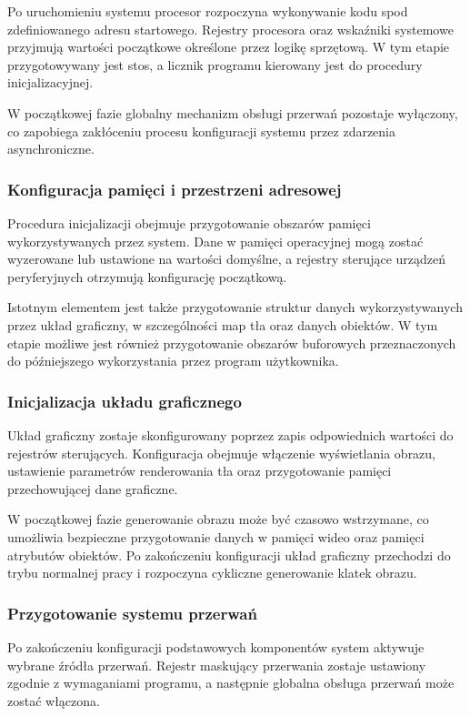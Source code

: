 \documentclass{article}
\begin{document}
Po uruchomieniu systemu procesor rozpoczyna wykonywanie kodu spod zdefiniowanego adresu startowego. Rejestry procesora oraz wskaźniki systemowe przyjmują wartości początkowe określone przez logikę sprzętową. W tym etapie przygotowywany jest stos, a licznik programu kierowany jest do procedury inicjalizacyjnej.

W początkowej fazie globalny mechanizm obsługi przerwań pozostaje wyłączony, co zapobiega zakłóceniu procesu konfiguracji systemu przez zdarzenia asynchroniczne.

\subsubsection{Konfiguracja pamięci i przestrzeni adresowej}

Procedura inicjalizacji obejmuje przygotowanie obszarów pamięci wykorzystywanych przez system. Dane w pamięci operacyjnej mogą zostać wyzerowane lub ustawione na wartości domyślne, a rejestry sterujące urządzeń peryferyjnych otrzymują konfigurację początkową.

Istotnym elementem jest także przygotowanie struktur danych wykorzystywanych przez układ graficzny, w szczególności map tła oraz danych obiektów. W tym etapie możliwe jest również przygotowanie obszarów buforowych przeznaczonych do późniejszego wykorzystania przez program użytkownika.

\subsubsection{Inicjalizacja układu graficznego}

Układ graficzny zostaje skonfigurowany poprzez zapis odpowiednich wartości do rejestrów sterujących. Konfiguracja obejmuje włączenie wyświetlania obrazu, ustawienie parametrów renderowania tła oraz przygotowanie pamięci przechowującej dane graficzne.

W początkowej fazie generowanie obrazu może być czasowo wstrzymane, co umożliwia bezpieczne przygotowanie danych w pamięci wideo oraz pamięci atrybutów obiektów. Po zakończeniu konfiguracji układ graficzny przechodzi do trybu normalnej pracy i rozpoczyna cykliczne generowanie klatek obrazu.

\subsubsection{Przygotowanie systemu przerwań}

Po zakończeniu konfiguracji podstawowych komponentów system aktywuje wybrane źródła przerwań. Rejestr maskujący przerwania zostaje ustawiony zgodnie z wymaganiami programu, a następnie globalna obsługa przerwań może zostać włączona.
\end{document}
